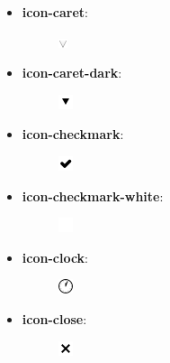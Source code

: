 \documentclass[letterpaper,10pt,english]{sphinxmanual}
\begin{document}
\begin{itemize}
\begin{description}
\end{description}

\item {} \begin{description}
\item[{\textbf{icon-caret}:}] \leavevmode
\includegraphics{caret.png}

\end{description}

\item {} \begin{description}
\item[{\textbf{icon-caret-dark}:}] \leavevmode
\includegraphics{caret-dark.png}

\end{description}

\item {} \begin{description}
\item[{\textbf{icon-checkmark}:}] \leavevmode
\includegraphics{checkmark.png}

\end{description}

\item {} \begin{description}
\item[{\textbf{icon-checkmark-white}:}] \leavevmode
\includegraphics{checkmark-white.png}

\end{description}

\item {} \begin{description}
\item[{\textbf{icon-clock}:}] \leavevmode
\includegraphics{clock.png}

\end{description}

\item {} \begin{description}
\item[{\textbf{icon-close}:}] \leavevmode
\includegraphics{close.png}


\end{description}
\end{itemize}
\end{document}
